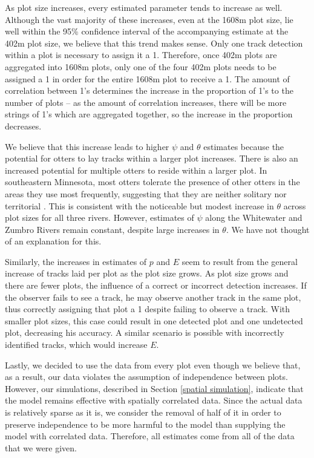 \documentclass[12pt]{article}
\begin{document}
    As plot size increases, every estimated parameter tends to increase as well.
    Although the vast majority of these increases, even at the 1608m plot size,
    lie well within the 95\% confidence interval of the accompanying estimate at
    the 402m plot size, we believe that this trend makes sense. Only one track
    detection within a plot is necessary to assign it a 1. Therefore, once 402m
    plots are aggregated into 1608m plots, only one of the four 402m plots needs
    to be assigned a 1 in order for the entire 1608m plot to receive a 1. The
    amount of correlation between 1's determines the increase in the proportion
    of 1's to the number of plots -- as the amount of correlation increases,
    there will be more strings of 1's which are aggregated together, so the
    increase in the proportion decreases.

    We believe that this increase leads to higher \(\psi\) and \(\theta\)
    estimates because the potential for otters to lay tracks within a larger
    plot increases. There is also an increased potential for multiple otters to
    reside within a larger plot. In southeastern Minnesota, most otters tolerate
    the
    presence of other otters in the areas they use most frequently, suggesting
    that they are neither solitary nor territorial \cite{Gorman2006}. This is
    consistent with the noticeable but modest increase in \(\theta\) across plot
    sizes for all three rivers.
    However, estimates of \(\psi\) along the Whitewater and Zumbro Rivers remain
    constant, despite large increases in \(\theta\).  We have not thought of an
    explanation for this.

    Similarly, the increases in estimates of \(p\) and \(E\) seem to result from
    the general increase of tracks laid per plot as the plot size grows. As plot
    size grows and there are fewer plots, the influence of a correct or
    incorrect detection increases.  If the observer fails to see a track, he may
    observe another track in the same plot, thus correctly assigning that plot a
    1 despite failing to observe a track.  With smaller plot sizes, this case
    could result in one detected plot and one undetected plot, decreasing his
    accuracy.  A similar scenario is possible with incorrectly identified
    tracks, which would increase \(E\).

    Lastly, we decided to use the data from every plot even though we believe
    that, as a result, our data violates the assumption of independence between
    plots. However, our simulations, described in Section \ref{spatial
    simulation}, indicate that the model remains effective with spatially
    correlated data.
    Since the actual data is relatively sparse as it is, we consider the removal
    of half of it in order to preserve independence to be more harmful to the
    model than supplying the model with correlated data. Therefore, all
    estimates come
    from all of the data that we were given.
\end{document}
